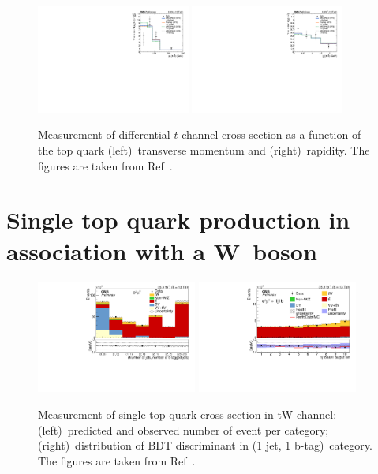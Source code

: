 \documentclass[12pt]{article}
\begin{document}
\begin{figure}[!htb]
\begin{center}
\includegraphics[width=0.45\textwidth]{unfolded_top_pt.pdf}\hspace{0.02\textwidth}
\includegraphics[width=0.45\textwidth]{unfolded_top_y.pdf}
\caption{Measurement of differential $t$-channel cross section as a function of the top quark (left)~transverse momentum and (right)~rapidity. The figures are taken from Ref~\cite{tchannel-diff}.}
\end{center}
\end{figure}

\section{Single top quark production in association with a W~boson}

\begin{figure}[!htb]
\begin{center}
\includegraphics[width=0.47\textwidth]{tW-categories.pdf}\hspace{0.02\textwidth}
\includegraphics[width=0.47\textwidth]{tW-bdt.pdf}
\caption{Measurement of single top quark cross section in tW-channel: (left)~predicted and observed number of event per category; (right)~distribution of BDT discriminant in (1 jet, 1 b-tag)~category. The figures are taken from Ref~\cite{tw-inc}.}
\end{center}
\end{figure}
\end{document}
